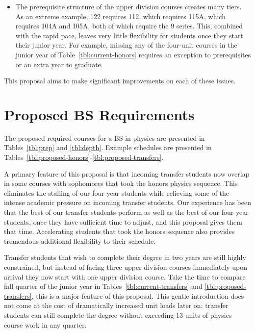 \documentclass[12pt]{article}
\begin{document}
\begin{itemize}
\item The prerequisite structure of the upper division courses creates
  many tiers.  As an extreme example, 122 requires 112, which requires
  115A, which requires 104A and 105A, both of which require the 9
  series.  This, combined with the rapid pace, leaves very little
  flexibility for students once they start their junior year.  For
  example, missing any of the four-unit courses in the junior year of
  Table~\ref{tbl:current-honors} requires an exception to
  prerequisites or an extra year to graduate.
\end{itemize}
This proposal aims to make significant improvements on each of these issues.

\newpage

\section{Proposed BS Requirements}

The proposed required courses for a BS in physics are presented in
Tables~\ref{tbl:prep} and \ref{tbl:depth}.  Example schedules are
presented in
Tables~\ref{tbl:proposed-honors}-\ref{tbl:proposed-transfers}.

A primary feature of this proposal is that incoming transfer students
now overlap in some courses with sophomores that took the honors
physics sequence.  This eliminates the stalling of our four-year
students while relieving some of the intense academic pressure on
incoming transfer students.  Our experience has been that the best of
our transfer students perform as well as the best of our four-year
students, once they have sufficient time to adjust, and this proposal
gives them that time.  Accelerating students that took the honors
sequence also provides tremendous additional flexibility to their
schedule.

Transfer students that wish to complete their degree in two years are
still highly constrained, but instead of facing three upper division
courses immediately upon arrival they now start with one upper
division course.  Take the time to compare fall quarter of the junior
year in Tables~\ref{tbl:current-transfers} and
\ref{tbl:proposed-transfers}, this is a major feature of this
proposal.  This gentle introduction does not come at the cost of
dramatically increased unit loads later on: transfer students can
still complete the degree without exceeding 13 units of physics
course work in any quarter.
\end{document}
